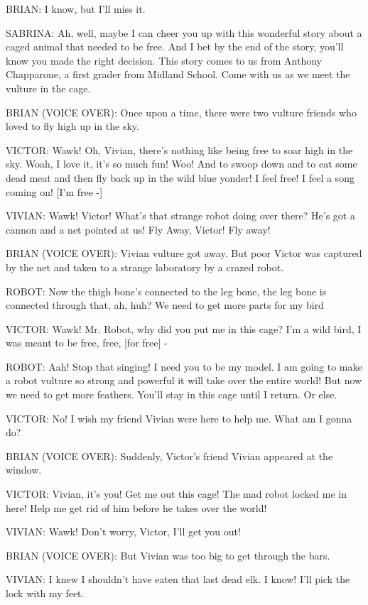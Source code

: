 BRIAN:
I know, but I'll miss it.

SABRINA:
Ah, well, maybe I can cheer you up with this wonderful story about a caged animal that needed to be free.
And I bet by the end of the story, you'll know you made the right decision.
This story comes to us from Anthony Chapparone, a first grader from Midland School.
Come with us as we meet the vulture in the cage.

BRIAN (VOICE OVER):
Once upon a time, there were two vulture friends who loved to fly high up in the sky.

VICTOR:
Wawk!
Oh, Vivian, there's nothing like being free to soar high in the sky.
Woah, I love it, it's so much fun!
Woo!
And to swoop down and to eat some dead meat and then fly back up in the wild blue yonder!
I feel free!
I feel a song coming on!
[I'm free -]

VIVIAN:
Wawk!
Victor!
What's that strange robot doing over there?
He's got a cannon and a net pointed at us!
Fly Away, Victor!
Fly away!

BRIAN (VOICE OVER):
Vivian vulture got away.
But poor Victor was captured by the net and taken to a strange laboratory by a crazed robot.

ROBOT:
Now the thigh bone's connected to the leg bone, the leg bone is connected through that, ah, huh?
We need to get more parts for my bird

VICTOR:
Wawk!
Mr.
Robot, why did you put me in this cage?
I'm a wild bird, I was meant to be free, free, [for free] -

ROBOT:
Aah!
Stop that singing!
I need you to be my model.
I am going to make a robot vulture so strong and powerful it will take over the entire world!
But now we need to get more feathers.
You'll stay in this cage until I return.
Or else.

VICTOR:
No!
I wish my friend Vivian were here to help me.
What am I gonna do?

BRIAN (VOICE OVER):
Suddenly, Victor's friend Vivian appeared at the window.

VICTOR:
Vivian, it's you!
Get me out this cage!
The mad robot locked me in here!
Help me get rid of him before he takes over the world!

VIVIAN:
Wawk!
Don't worry, Victor, I'll get you out!

BRIAN (VOICE OVER):
But Vivian was too big to get through the bars.

VIVIAN:
I knew I shouldn't have eaten that last dead elk.
I know!
I'll pick the lock with my feet.

